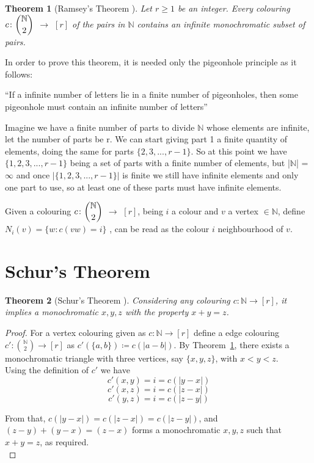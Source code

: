 \documentclass[12pt,twoside,a4paper]{book}
\numberwithin{equation}{section}
\newtheorem{theorem}             {Theorem}[section]
\theoremstyle{remark}
\begin{document}
\begin{theorem}[{Ramsey's Theorem \cite{Ra29}}]\label{thm:RamseyTheorem}
Let $r \geq 1$ be an integer. Every colouring $c\colon \dbinom{\mathbb{N}}{2}$ $\rightarrow$ $[r]$ of the pairs in $\mathbb{N}$ contains an infinite monochromatic subset of pairs.
\end{theorem}

In order to prove this theorem, it is needed only the pigeonhole principle as it follows:

``If a infinite number of letters lie in a finite number of pigeonholes, then some pigeonhole must contain an infinite number of letters''

Imagine we have a finite number of parts to divide $\mathbb{N}$ whose elements are infinite, let the number of parts be r. We can start giving part 1 a finite quantity of elements, doing the same for parts $\{2, 3,..., r-1\}$. So at this point we have $\{1,2,3,...,r-1\}$ being a set of parts with a finite number of elements, but |$\mathbb{N}$| = $\infty$ and once $|\{1, 2, 3,..., r-1\}|$ is finite we still have infinite elements and only one part to use, so at least one of these parts must have infinite elements.

Given a colouring $c\colon\dbinom{\mathbb{N}}{2}$ $\rightarrow$ $[r]$, being $i$ a colour and  $v$ a vertex $\in \mathbb{N}$, define $N_i(v) =\{ w: c(vw)=i\}$ , can be read as the colour $i$ neighbourhood of $v$.

\section{Schur's Theorem}

\begin{theorem}[{Schur's Theorem \cite{Sc16}}]\label{thm:Schur'sTheorem} %
 Considering any colouring $c\colon \mathbb{N} \rightarrow [r]$, it implies a monochromatic $x,y,z$ with the property $x+y=z$.
\end{theorem}
\begin{proof}
  For a vertex colouring  given as $c\colon \mathbb{N} \rightarrow [r]$ define a edge colouring $c'\colon \binom{\mathbb{N}}{2} \rightarrow [r]$ as $c'(\{a,b\}) \coloneqq c(|a-b|)$. By Theorem~\ref{thm:RamseyTheorem}, there exists a monochromatic triangle with three vertices, say $\{x,y,z\}$, with $x<y<z$.\\
Using the definition of $c'$  we have
$$c'({x,y}) = i = c(|y-x|)$$
$$c'({x,z})=  i = c(|z-x|)$$
$$c'({y,z}) = i = c(|z-y|)$$

From that, $c(|y-x|) = c(|z-x|) = c(|z-y|)$, and $(z-y)+(y-x)=(z-x)$ forms a monochromatic $x,y,z$ such that $x+y=z$, as required.\\
\end{proof}
\end{document}
